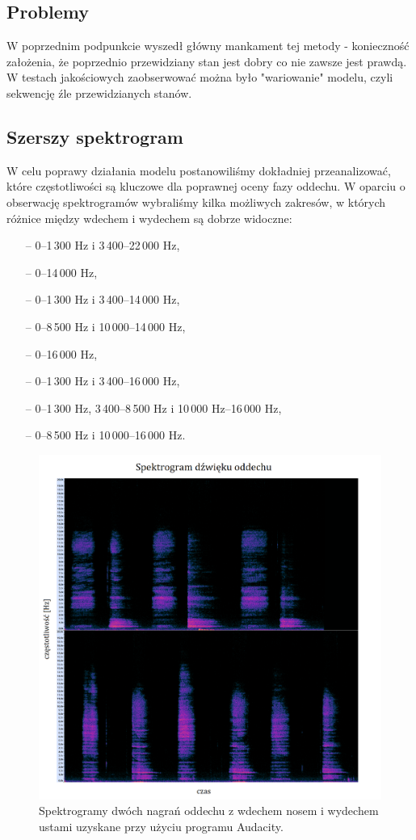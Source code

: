 \documentclass[polish]{article}
\begin{document}
\subsection{Problemy}
W poprzednim podpunkcie wyszedł główny mankament tej metody - konieczność założenia, że poprzednio
przewidziany stan jest dobry co nie zawsze jest prawdą. W testach jakościowych zaobserwować można było
"wariowanie" modelu, czyli sekwencję źle przewidzianych stanów.
\subsection{Szerszy spektrogram}
W celu poprawy działania modelu postanowiliśmy dokładniej przeanalizować, które częstotliwości są kluczowe dla poprawnej oceny fazy oddechu. W oparciu o obserwację spektrogramów wybraliśmy kilka możliwych zakresów, w których różnice między wdechem i wydechem są dobrze widoczne:
\begin{itemize}
	\setlength\itemsep{-0.25em}
	\item[--] 0--1\,300 \unit{Hz} i 3\,400--22\,000 \unit{Hz},
	\item[--] 0--14\,000 \unit{Hz},
	\item[--] 0--1\,300 \unit{Hz} i 3\,400--14\,000 \unit{Hz},
	\item[--] 0--8\,500 \unit{Hz} i 10\,000--14\,000 \unit{Hz},
	\item[--] 0--16\,000 \unit{Hz},
	\item[--] 0--1\,300 \unit{Hz} i 3\,400--16\,000 \unit{Hz},
	\item[--] 0--1\,300 \unit{Hz}, 3\,400--8\,500 \unit{Hz} i 10\,000 \unit{Hz}--16\,000 \unit{Hz},
	\item[--] 0--8\,500 \unit{Hz} i 10\,000--16\,000 \unit{Hz}.
\end{itemize}
\begin{figure}[H]
	\centering
	\includegraphics[width=13cm]{spektrogram_wydech_ustami}
	\caption{Spektrogramy dwóch nagrań oddechu z wdechem nosem i wydechem ustami uzyskane przy użyciu programu Audacity.}
\end{figure}
\end{document}
